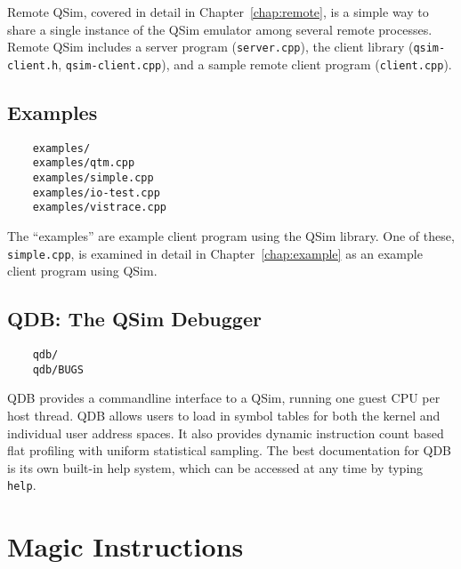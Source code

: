 \documentclass[letterpaper, 10pt]{book}
\begin{document}
Remote QSim, covered in detail in Chapter~\ref{chap:remote}, is a simple way to
share a single instance of the QSim emulator among several remote processes.
Remote QSim includes a server program (\texttt{server.cpp}), the client library
(\texttt{qsim-client.h}, \texttt{qsim-client.cpp}), and a sample remote client
program (\texttt{client.cpp}).

\subsection{Examples}
\begin{verbatim}
    examples/
    examples/qtm.cpp
    examples/simple.cpp
    examples/io-test.cpp
    examples/vistrace.cpp
\end{verbatim}
The ``examples'' are example client program using the QSim library. One of
these, \texttt{simple.cpp}, is examined in detail in Chapter~\ref{chap:example} 
as an example client program using QSim.

\subsection{QDB: The QSim Debugger}
\begin{verbatim}
    qdb/
    qdb/BUGS
\end{verbatim}
QDB provides a commandline interface to a QSim, running one guest CPU per host
thread. QDB allows users to load in symbol tables for both the kernel and
individual user address spaces. It also provides dynamic instruction count
based flat profiling with uniform statistical sampling. The best documentation
for QDB is its own built-in help system, which can be accessed at any time by
typing \texttt{help}.

\section{Magic Instructions} \label{sec:magic}
\end{document}
